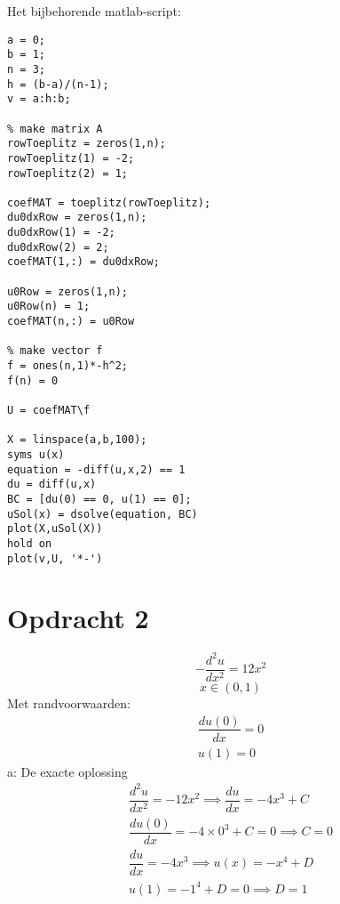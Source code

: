 \documentclass[11pt]{article}
\begin{document}
Het bijbehorende matlab-script:
\begin{lstlisting}
a = 0;
b = 1;
n = 3;
h = (b-a)/(n-1);
v = a:h:b;

% make matrix A
rowToeplitz = zeros(1,n);
rowToeplitz(1) = -2;
rowToeplitz(2) = 1;

coefMAT = toeplitz(rowToeplitz);
du0dxRow = zeros(1,n);
du0dxRow(1) = -2;
du0dxRow(2) = 2;
coefMAT(1,:) = du0dxRow;

u0Row = zeros(1,n);
u0Row(n) = 1;
coefMAT(n,:) = u0Row

% make vector f
f = ones(n,1)*-h^2;
f(n) = 0

U = coefMAT\f

X = linspace(a,b,100);
syms u(x)
equation = -diff(u,x,2) == 1
du = diff(u,x)
BC = [du(0) == 0, u(1) == 0];
uSol(x) = dsolve(equation, BC)
plot(X,uSol(X))
hold on
plot(v,U, '*-')
\end{lstlisting}
\newpage
\section{Opdracht 2}
$$-\dfrac{d^2u}{dx^2} = 12x^2$$
$$ x \in (0,1)$$
Met randvoorwaarden: 
\begin{align*}
\dfrac{du(0)}{dx} = 0\\
u(1) = 0
\end{align*}
a: De exacte oplossing
\begin{gather*}
\dfrac{d^2u}{dx^2} = -12x^2 \implies \dfrac{du}{dx} = -4x^3 + C\\
\dfrac{du(0)}{dx} = -4 \times 0^3 + C = 0 \implies C = 0\\
\dfrac{du}{dx} = -4x^3 \implies u(x) = -x^4 + D\\
u(1) = -1^4 + D = 0 \implies D = 1
\end{gather*}
\end{document}
